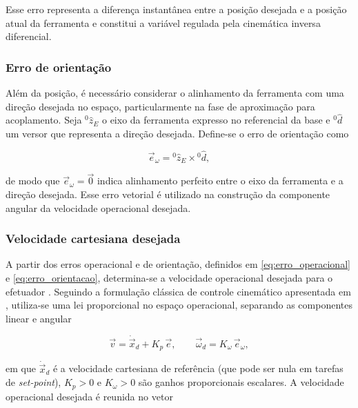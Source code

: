 Esse erro representa a diferença instantânea entre a posição desejada e a posição atual da ferramenta e constitui a variável regulada pela cinemática inversa diferencial.

\subsubsection{Erro de orientação}

Além da posição, é necessário considerar o alinhamento da ferramenta com uma direção desejada no espaço, particularmente na fase de aproximação para acoplamento.
Seja ${}^{0}\!\hat{z}_{E}$ o eixo da ferramenta expresso no referencial da base e ${}^{0}\!\hat{d}$ um versor que representa a direção desejada.
Define-se o erro de orientação como

\begin{equation}
\label{eq:erro_orientacao}
\vec{e}_{\omega}
=
{}^{0}\!\hat{z}_{E}
\times
{}^{0}\!\hat{d},
\end{equation}

de modo que $\vec{e}_{\omega} = \vec{0}$ indica alinhamento perfeito entre o eixo da ferramenta e a direção desejada. Esse erro vetorial é utilizado na construção da componente angular da velocidade operacional desejada.


\subsubsection{Velocidade cartesiana desejada}

A partir dos erros operacional e de orientação, definidos em \eqref{eq:erro_operacional} e \eqref{eq:erro_orientacao}, determina-se a velocidade operacional desejada para o efetuador \cite{sciavicco_siciliano2010}.
Seguindo a formulação clássica de controle cinemático apresentada em \cite{sciavicco_siciliano2010}, utiliza-se uma lei proporcional no espaço operacional, separando as componentes linear e angular

\begin{equation}
\label{eq:velocidade_cartesiana_desejada}
\vec{v}
=
\dot{\vec{x}}_{d}
+
K_{p}\,\vec{e},
\qquad
\vec{\omega}_{d}
=
K_{\omega}\,\vec{e}_{\omega},
\end{equation}

em que $\dot{\vec{x}}_{d}$ é a velocidade cartesiana de referência (que pode ser nula em tarefas de \emph{set-point}), $K_{p}>0$ e $K_{\omega}>0$ são ganhos proporcionais escalares.
A velocidade operacional desejada é reunida no vetor

